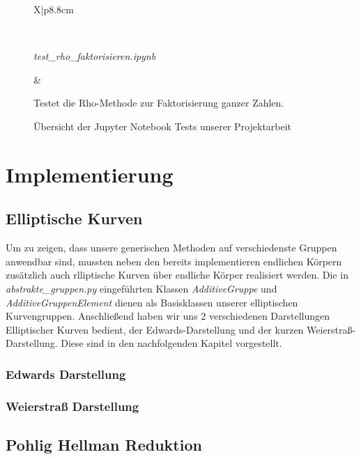 \documentclass{scrartcl}
\begin{document}
\begin{figure}[h]
\begin{tabularx}{\linewidth}{X|p{8.8cm}}
\begin{minipage}{\linewidth}
		\end{minipage} \\
		\hline
  		\begin{minipage}{\linewidth}
			\emph{test\_rho\_faktorisieren.ipynb}
		\end{minipage} &
		\begin{minipage}{\linewidth}
			  \vspace{2pt} Testet die Rho-Methode zur Faktorisierung ganzer Zahlen.   \vspace{2pt}
		\end{minipage}
	\end{tabularx}
	\renewcommand{\arraystretch}{1}
	\caption{Übersicht der Jupyter Notebook Tests unserer Projektarbeit}
	\label{fig:tests}
\end{figure}


\section{Implementierung}
\label{sec:implementierung}

\subsection{Elliptische Kurven}
\label{sec:elliptische_kurven}

Um zu zeigen, dass unsere generischen Methoden auf verschiedenste Gruppen anwendbar sind, mussten neben den bereits implementieren endlichen Körpern zusätzlich auch rlliptische Kurven über endliche Körper realisiert werden. 
Die in \emph{abstrakte\_gruppen.py} eingeführten Klassen \emph{AdditiveGruppe} und \emph{AdditiveGruppenElement} dienen als Basisklassen unserer elliptischen Kurvengruppen.
Anschließend haben wir uns 2 verschiedenen Darstellungen Elliptischer Kurven bedient, der Edwards-Darstellung und der kurzen Weierstraß-Darstellung. Diese sind in den nachfolgenden Kapitel vorgestellt.
\subsubsection{Edwards Darstellung}
\label{sec:edwards_kurven}

\subsubsection{Weierstraß Darstellung}
\label{sec:weierstrass_kurven}

\subsection{Pohlig Hellman Reduktion}
\label{sec:pohlig_hellman}
\end{document}

